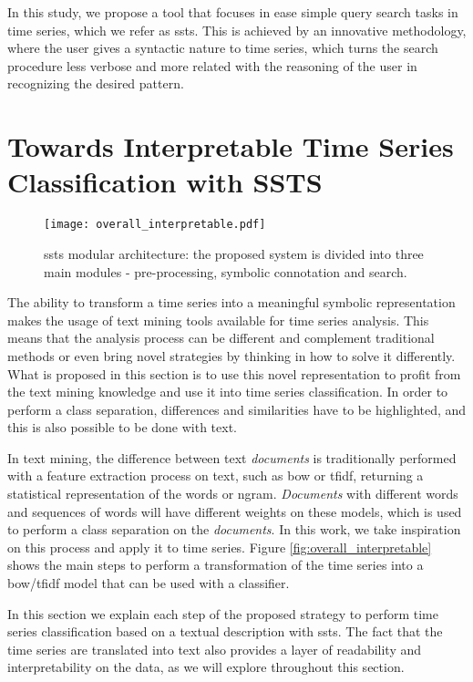 In this study, we propose a tool that focuses in ease simple query search tasks in time series, which we refer as \gls{ssts}. This is achieved by an innovative methodology, where the user gives a syntactic nature to time series, which turns the search procedure less verbose and more related with the reasoning of the user in recognizing the desired pattern.







\section{Towards Interpretable Time Series Classification with SSTS}

\begin{figure}
\centering
\texttt{[image: overall\_interpretable.pdf]}
\label{fig:ssts_interpretable}
\caption{\gls{ssts} modular architecture: the proposed system is divided into three main modules - pre-processing, symbolic connotation and search.}
\end{figure}


The ability to transform a time series into a meaningful symbolic representation makes the usage of text mining tools available for time series analysis. This means that the analysis process can be different and complement traditional methods or even bring novel strategies by thinking in how to solve it differently. What is proposed in this section is to use this novel representation to profit from the text mining knowledge and use it into time series classification. In order to perform a class separation, differences and similarities have to be highlighted, and this is also possible to be done with text.
\par
In text mining, the difference between text \textit{documents} is traditionally performed with a feature extraction process on text, such as \gls{bow} or \gls{tfidf}, returning a statistical representation of the words or ngram. \textit{Documents} with different words and sequences of words will have different weights on these models, which is used to perform a class separation on the \textit{documents}. In this work, we take inspiration on this process and apply it to time series. Figure \ref{fig:overall_interpretable} shows the main steps to perform a transformation of the time series into a \gls{bow}/\gls{tfidf} model that can be used with a classifier. 
\par
In this section we explain each step of the proposed strategy to perform time series classification based on a textual description with \gls{ssts}. The fact that the time series are translated into text also provides a layer of readability and interpretability on the data, as we will explore throughout this section.

